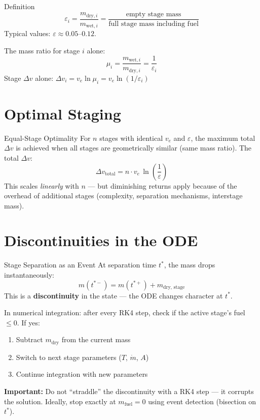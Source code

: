 \documentclass[12pt, a4paper]{article}
\begin{document}
\begin{theorybox}{Definition}
\[
  \varepsilon_i = \frac{m_{\text{dry},i}}{m_{\text{wet},i}} = \frac{\text{empty stage mass}}{\text{full stage mass including fuel}}
\]
Typical values: $\varepsilon \approx 0.05$–$0.12$.

The mass ratio for stage $i$ alone:
\[
  \mu_i = \frac{m_{\text{wet},i}}{m_{\text{dry},i}} = \frac{1}{\varepsilon_i}
\]
Stage $\Delta v$ alone: $\Delta v_i = v_e\ln\mu_i = v_e\ln(1/\varepsilon_i)$
\end{theorybox}

\section{Optimal Staging}

\begin{theorybox}{Equal-Stage Optimality}
For $n$ stages with identical $v_e$ and $\varepsilon$, the maximum total $\Delta v$ is achieved when all stages are geometrically similar (same mass ratio). The total $\Delta v$:
\[
  \Delta v_\text{total} = n\cdot v_e\,\ln\!\left(\frac{1}{\varepsilon}\right)
\]
This scales \textit{linearly} with $n$ — but diminishing returns apply because of the overhead of additional stages (complexity, separation mechanisms, interstage mass).
\end{theorybox}

\section{Discontinuities in the ODE}

\begin{theorybox}{Stage Separation as an Event}
At separation time $t^*$, the mass drops instantaneously:
\[
  m(t^{*-}) = m(t^{*+}) + m_{\text{dry, stage}}
\]
This is a \textbf{discontinuity} in the state — the ODE changes character at $t^*$.

In numerical integration: after every RK4 step, check if the active stage's fuel $\leq 0$.
If yes:
\begin{enumerate}
  \item Subtract $m_\text{dry}$ from the current mass
  \item Switch to next stage parameters ($T$, $\dot{m}$, $A$)
  \item Continue integration with new parameters
\end{enumerate}
\textbf{Important:} Do not ``straddle'' the discontinuity with a RK4 step — it corrupts the solution.
Ideally, stop exactly at $m_\text{fuel} = 0$ using event detection (bisection on $t^*$).
\end{theorybox}
\end{document}
